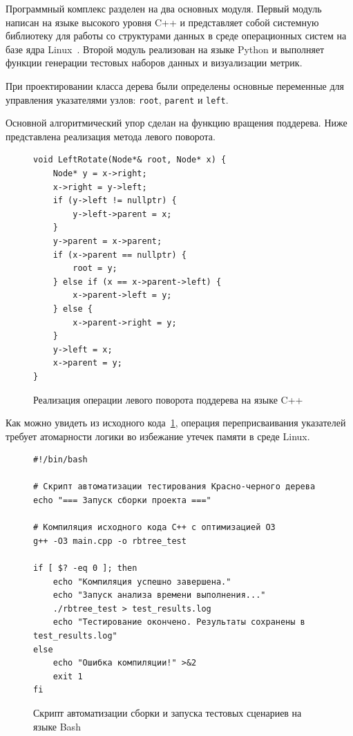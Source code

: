 \documentclass[coursework]{SCWorks}
\begin{document}
Программный комплекс разделен на два основных модуля. Первый модуль написан на языке высокого уровня C++ и представляет собой системную библиотеку для работы со структурами данных в среде операционных систем на базе ядра Linux~\cite{tanenbaum2015}. Второй модуль реализован на языке Python и выполняет функции генерации тестовых наборов данных и визуализации метрик.

При проектировании класса дерева были определены основные переменные для управления указателями узлов: \texttt{root}, \texttt{parent} и \texttt{left}.\

Основной алгоритмический упор сделан на функцию вращения поддерева. Ниже представлена реализация метода левого поворота.

\begin{figure}[h!]
\caption{Реализация операции левого поворота поддерева на языке C++}
\label{code:left_rotate}
\begin{verbatim}
void LeftRotate(Node*& root, Node* x) {
    Node* y = x->right;
    x->right = y->left;
    if (y->left != nullptr) {
        y->left->parent = x;
    }
    y->parent = x->parent;
    if (x->parent == nullptr) {
        root = y;
    } else if (x == x->parent->left) {
        x->parent->left = y;
    } else {
        x->parent->right = y;
    }
    y->left = x;
    x->parent = y;
}
\end{verbatim}
\end{figure}

Как можно увидеть из исходного кода~\ref{code:left_rotate}, операция переприсваивания указателей требует атомарности логики во избежание утечек памяти в среде Linux.\

\begin{figure}[h!]
\caption{Скрипт автоматизации сборки и запуска тестовых сценариев на языке Bash}
\label{code:build_script}
\begin{verbatim}
#!/bin/bash

# Скрипт автоматизации тестирования Красно-черного дерева
echo "=== Запуск сборки проекта ==="

# Компиляция исходного кода C++ с оптимизацией O3
g++ -O3 main.cpp -o rbtree_test

if [ $? -eq 0 ]; then
    echo "Компиляция успешно завершена."
    echo "Запуск анализа времени выполнения..."
    ./rbtree_test > test_results.log
    echo "Тестирование окончено. Результаты сохранены в test_results.log"
else
    echo "Ошибка компиляции!" >&2
    exit 1
fi
\end{verbatim}
\end{figure}
\end{document}
